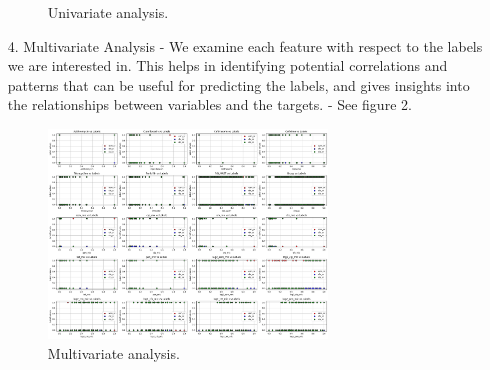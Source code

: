 \documentclass[manuscript,screen,review, nonacm]{acmart}
\begin{document}
\begin{itemize}
\begin{figure}[H]
                \caption{Univariate analysis.}
                \vspace{-10pt}
            \end{figure}

    \item[4.] Multivariate Analysis - We examine each feature with respect to the labels we are interested in. This helps in identifying potential correlations and
    patterns that can be useful for predicting the labels, and gives insights into the relationships between variables and the targets. - See figure 2.
            \begin{figure}[H]
                \centering
                \vspace{-10pt}
                \includegraphics[width=0.7\textwidth]{figures/multivar.png}
                \caption{Multivariate analysis.}
                \vspace{-10pt}
            \end{figure}


\end{itemize}
\end{document}
